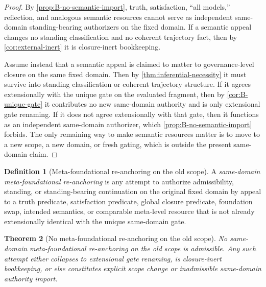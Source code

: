 \documentclass[11pt]{article}
\theoremstyle{plain}
\newtheorem{theorem}{Theorem}[section]
\theoremstyle{definition}
\newtheorem{definition}[theorem]{Definition}
\begin{document}
\begin{proof}
By \cref{prop:B-no-semantic-import}, truth, satisfaction, ``all models,'' reflection, and analogous semantic resources cannot serve as independent same-domain standing-bearing authorizers on the fixed domain. If a semantic appeal changes no standing classification and no coherent trajectory fact, then by \cref{cor:external-inert} it is closure-inert bookkeeping.

Assume instead that a semantic appeal is claimed to matter to governance-level closure on the same fixed domain. Then by \cref{thm:inferential-necessity} it must survive into standing classification or coherent trajectory structure. If it agrees extensionally with the unique gate on the evaluated fragment, then by \cref{cor:B-unique-gate} it contributes no new same-domain authority and is only extensional gate renaming. If it does not agree extensionally with that gate, then it functions as an independent same-domain authorizer, which \cref{prop:B-no-semantic-import} forbids. The only remaining way to make semantic resources matter is to move to a new scope, a new domain, or fresh gating, which is outside the present same-domain claim.
\end{proof}

\begin{definition}[Meta-foundational re-anchoring on the old scope]
A \emph{same-domain meta-foundational re-anchoring} is any attempt to authorize admissibility, standing, or standing-bearing continuation on the original fixed domain by appeal to a truth predicate, satisfaction predicate, global closure predicate, foundation swap, intended semantics, or comparable meta-level resource that is not already extensionally identical with the unique same-domain gate.
\end{definition}

\begin{theorem}[No meta-foundational re-anchoring on the old scope]
\label{thm:no-meta-reanchoring}
No same-domain meta-foundational re-anchoring on the old scope is admissible. Any such attempt either collapses to extensional gate renaming, is closure-inert bookkeeping, or else constitutes explicit scope change or inadmissible same-domain authority import.
\end{theorem}
\end{document}
